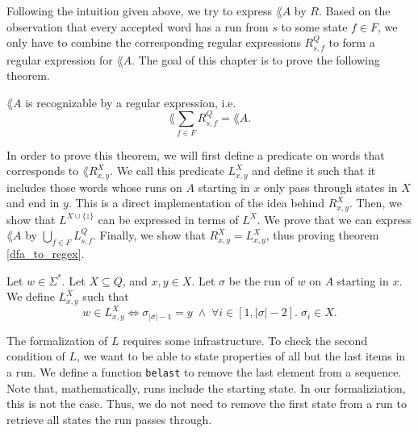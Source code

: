 

Following the intuition given above, we try to express $\lang{A}$ by $R$.
Based on the observation that every accepted word has a run from $s$ to some state $f \in F$, 
we only have to combine the corresponding regular expressions $R^Q_{s,f}$ to form a regular expression for $\lang{A}$.
The goal of this chapter is to prove the following theorem. 

\begin{theorem}
    \label{dfa_to_regex} $\lang{A}$ is recognizable by a regular expression, i.e.
    \begin{equation*}
        \lang{\sum\limits_{f \in F} R^Q_{s,f}} = \lang{A}.
    \end{equation*}
\end{theorem}

In order to prove this theorem, we will first define a predicate on words that corresponds to $\lang{R^X_{x,y}}$.
We call this predicate $L^X_{x,y}$ and define it such that it includes those words 
whose runs on $A$ starting in $x$ only pass through states in $X$ and end in $y$.
This is a direct implementation of the idea behind $R^X_{x,y}$.
Then, we show that $L^{X \cup \{z\}}$ can be expressed in terms of $L^X$.
We prove that we can express $\lang{A}$ by $\bigcup_{f\in F} L^Q_{s,f}$.
Finally, we show that $R^X_{x,y} = L^X_{x,y}$, thus proving theorem \ref{dfa_to_regex}.

\begin{definition}
    Let $w \in \Sigma^*$.
    Let $X \subseteq Q$, and $x,y \in X$.
    Let $\sigma$ be the run of $w$ on $A$ starting in $x$.
    We define $L^X_{x,y}$ such that
    \begin{equation*}
        w \in L^X_{x,y} \iff \sigma_{|\sigma|-1} = y \; \wedge \; \forall i \in [1,|\sigma|-2]. \; \sigma_i \in X.
    \end{equation*}
\end{definition}

The formalization of $L$ requires some infrastructure. 
To check the second condition of $L$, we want to be able to state properties of all but the last items in a run.
We define a function \lstinline{belast} to remove the last element from a sequence. 
Note that, mathematically, runs include the starting state.
In our formaliziation, this is not the case.
Thus, we do not need to remove the first state from a run to retrieve all states the run passes through.

